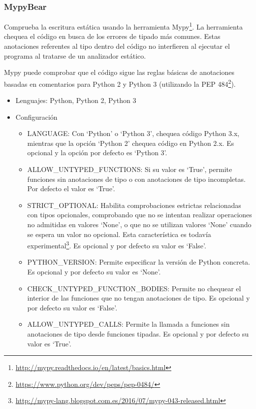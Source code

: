 \documentclass[a4paper, 12pt]{book}
\begin{document}
\subsubsection{MypyBear}
\label{sec:seccion1.2.4}
Comprueba la escritura estática usando la herramienta Mypy\footnote{\url{http://mypy.readthedocs.io/en/latest/basics.html}}. La herramienta chequea el código en busca de los errores de tipado más comunes. Estas anotaciones referentes al tipo dentro del código no interfieren al ejecutar el programa al tratarse de un analizador estático.

Mypy puede comprobar que el código sigue las reglas básicas de anotaciones basadas en comentarios para Python 2 y Python 3 (utilizando la PEP 484\footnote{\url{https://www.python.org/dev/peps/pep-0484/}}).

\begin{itemize}
  \item Lenguajes: Python, Python 2, Python 3
  \item Configuración
    \begin{itemize}
          \item LANGUAGE: Con `Python' o `Python 3', chequea código Python 3.x, mientras que la opción `Python 2' chequea código en Python 2.x. Es opcional y la opción por defecto es `Python 3'.
          \item ALLOW\_UNTYPED\_FUNCTIONS: Si su valor es `True', permite funciones sin anotaciones de tipo o con anotaciones de tipo incompletas. Por defecto el valor es `True'.
          \item STRICT\_OPTIONAL: Habilita comprobaciones estrictas relacionadas con tipos opcionales, comprobando que no se intentan realizar operaciones no admitidas en valores `None', o que no se utilizan valores `None' cuando se espera un valor no opcional. Esta característica es todavía experimental\footnote{\url{http://mypy-lang.blogspot.com.es/2016/07/mypy-043-released.html}}. Es opcional y por defecto su valor es `False'.
          \item PYTHON\_VERSION: Permite especificar la versión de Python concreta. Es opcional y por defecto su valor es `None'.
          \item CHECK\_UNTYPED\_FUNCTION\_BODIES: Permite no chequear el interior de las funciones que no tengan anotaciones de tipo. Es opcional y por defecto su valor es `False'.
          \item ALLOW\_UNTYPED\_CALLS: Permite la llamada a funciones sin anotaciones de tipo desde funciones tipadas. Es opcional y por defecto su valor es `True'.
    \end{itemize}
\end{itemize}
\end{document}
